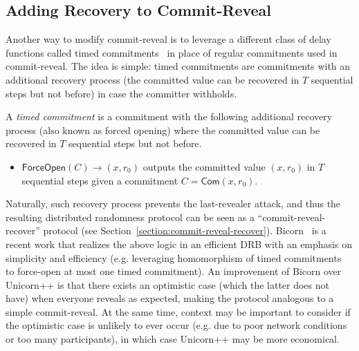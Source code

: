 \subsection{Adding Recovery to Commit-Reveal}
Another way to modify commit-reveal is to leverage a different class of delay functions called timed commitments~\cite{boneh2000timed} in place of regular commitments used in commit-reveal.
The idea is simple: timed commitments are commitments with an additional recovery process (the committed value can be recovered in $T$ sequential steps but not before) in case the committer withholds.

\begin{definition}
A \textit{timed commitment} is a commitment with the following additional recovery process (also known as forced opening) where the committed value can be recovered in $T$ sequential steps but not before.
\begin{itemize}
\item $\mathsf{ForceOpen}(C) \rightarrow (x, r_0)$ outputs the committed value $(x, r_0)$ in $T$ sequential steps given a commitment $C = \mathsf{Com}(x, r_0)$.
\end{itemize}
\end{definition}

Naturally, such recovery process prevents the last-revealer attack, and thus the resulting distributed randomness protocol can be seen as a ``commit-reveal-recover'' protocol (see Section~\ref{section:commit-reveal-recover}).
Bicorn~\cite{choi2022bicorn} is a recent work that realizes the above logic in an efficient DRB with an emphasis on simplicity and efficiency (e.g. leveraging homomorphism of timed commitments~\cite{thyagarajan2021efficient} to force-open at most one timed commitment).
An improvement of Bicorn over Unicorn++ is that there exists an optimistic case (which the latter does not have) when everyone reveals as expected, making the protocol analogous to a simple commit-reveal.
At the same time, context may be important to consider if the optimistic case is unlikely to ever occur (e.g. due to poor network conditions or too many participants), in which case Unicorn++ may be more economical.


